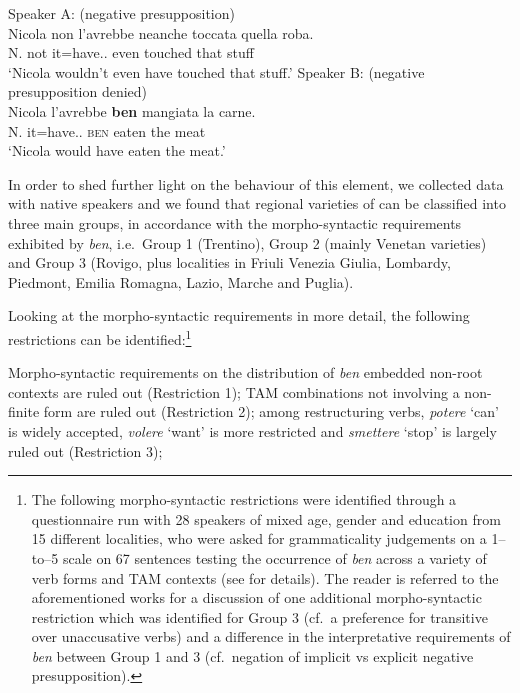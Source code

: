 \documentclass[output=paper]{langsci/langscibook}
\begin{document}
\ea {}
	\ea Speaker A: (negative presupposition)\\
        \sn
		\gll    Nicola non l’avrebbe neanche toccata quella roba.\\
			    N. not it=have.\Cond{}.\Tsg{} even touched that stuff\\
        \glt    \enquote*{Nicola wouldn’t even have touched that stuff.}
	\ex Speaker B: (negative presupposition denied)\\
        \sn
		\gll    Nicola l’avrebbe \textbf{ben} mangiata la carne.\\
			    N. it=have.\Cond{}.\Tsg{} \textsc{ben} eaten the meat\\
        \glt    \enquote*{Nicola would have eaten the meat.}
	\z
\z

In order to shed further light on the behaviour of this element, we collected
data with native speakers and we found that regional varieties of  can
be classified into three main groups, in accordance with the morpho-syntactic
requirements exhibited by \emph{ben}, i.e.\ Group 1 (Trentino), Group 2 (mainly
Venetan varieties) and Group 3 (Rovigo, plus localities in Friuli Venezia
Giulia, Lombardy, Piedmont, Emilia Romagna, Lazio, Marche and Puglia).

Looking at the morpho-syntactic requirements in more detail, the following
restrictions can be identified:\footnote{The following morpho-syntactic
    restrictions were identified through a questionnaire run with 28 speakers
    of mixed age, gender and education from 15 different localities, who were
    asked for grammaticality judgements on a 1--to--5 scale on 67 sentences
    testing the occurrence of \emph{ben} across a variety of verb forms and
    \gls{TAM} contexts (see \citealt{CognSchi2018b,CognSchi2018} for details).
    The reader is referred to the aforementioned works for a discussion of one
    additional morpho-syntactic restriction which was identified for Group 3
    (cf.\ a preference for transitive over unaccusative verbs) and a difference
    in the interpretative requirements of \emph{ben} between Group 1 and 3
    (cf.\ negation of implicit vs explicit negative presupposition).}

\newpage

\ea\label{ex:key:12.3} Morpho-syntactic requirements on the distribution of
        \emph{ben}
	\ea embedded non-root contexts are ruled out (Restriction 1);
    \ex \gls{TAM} combinations not involving a non-finite form are ruled out
        (Restriction 2);
    \ex among restructuring verbs, \emph{potere} ‘can’ is widely accepted,
        \emph{volere} ‘want’ is more restricted and
        \emph{smettere} ‘stop’ is largely ruled out (Restriction 3);
	\z
\z
\end{document}
